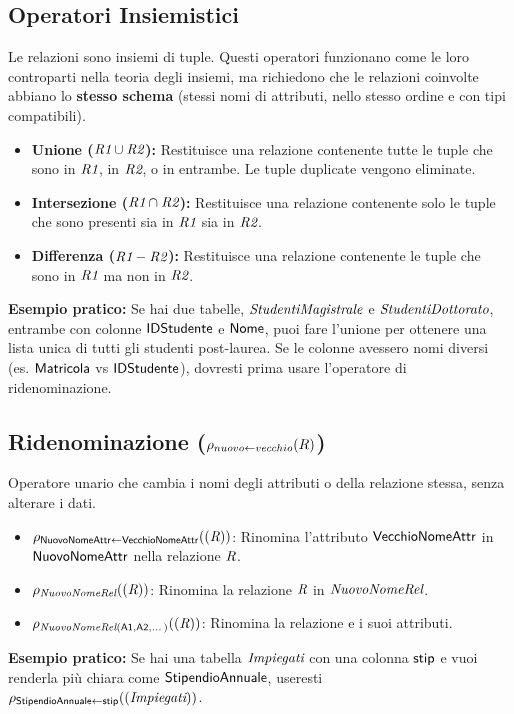 	\subsection{Operatori Insiemistici}
	Le relazioni sono insiemi di tuple. Questi operatori funzionano come le loro controparti nella teoria degli insiemi, ma richiedono che le relazioni coinvolte abbiano lo \textbf{stesso schema} (stessi nomi di attributi, nello stesso ordine e con tipi compatibili).
	\begin{itemize}
		\item \textbf{Unione ($\textit{R1} \cup \textit{R2}$):} Restituisce una relazione contenente tutte le tuple che sono in $\textit{R1}$, in $\textit{R2}$, o in entrambe. Le tuple duplicate vengono eliminate.
		\item \textbf{Intersezione ($\textit{R1} \cap \textit{R2}$):} Restituisce una relazione contenente solo le tuple che sono presenti sia in $\textit{R1}$ sia in $\textit{R2}$.
		\item \textbf{Differenza ($\textit{R1} - \textit{R2}$):} Restituisce una relazione contenente le tuple che sono in $\textit{R1}$ ma non in $\textit{R2}$.
	\end{itemize}
	\textbf{Esempio pratico:} Se hai due tabelle, $\textit{StudentiMagistrale}$ e $\textit{StudentiDottorato}$, entrambe con colonne $\textsf{IDStudente}$ e $\textsf{Nome}$, puoi fare l'unione per ottenere una lista unica di tutti gli studenti post-laurea. Se le colonne avessero nomi diversi (es. $\textsf{Matricola}$ vs $\textsf{IDStudente}$), dovresti prima usare l'operatore di ridenominazione.
	
	\subsection{Ridenominazione ($\rho_{nuovo \leftarrow vecchio}(R)$)}
	Operatore unario che cambia i nomi degli attributi o della relazione stessa, senza alterare i dati.
	\begin{itemize}
		\item $\rho_{\textsf{NuovoNomeAttr} \leftarrow \textsf{VecchioNomeAttr}}((\textit{R}))$: Rinomina l'attributo $\textsf{VecchioNomeAttr}$ in $\textsf{NuovoNomeAttr}$ nella relazione $\textit{R}$.
		\item $\rho_{\textit{NuovoNomeRel}}((\textit{R}))$: Rinomina la relazione $\textit{R}$ in $\textit{NuovoNomeRel}$.
		\item $\rho_{\textit{NuovoNomeRel}(\textsf{A1}, \textsf{A2}, \dots)}((\textit{R}))$: Rinomina la relazione e i suoi attributi.
	\end{itemize}
	\textbf{Esempio pratico:} Se hai una tabella $\textit{Impiegati}$ con una colonna $\textsf{stip}$ e vuoi renderla più chiara come $\textsf{StipendioAnnuale}$, useresti $\rho_{\textsf{StipendioAnnuale} \leftarrow \textsf{stip}}((\textit{Impiegati}))$.
	
